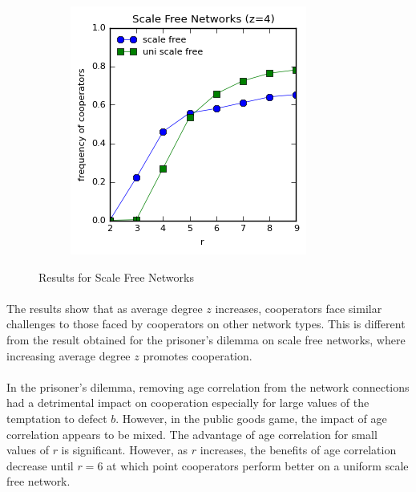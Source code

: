 \documentclass{article}
\begin{document}
\begin{figure}[h]
\begin{subfigure}[b]{0.4\textwidth}
			\caption{}
		\end{subfigure}
		\begin{subfigure}[b]{0.4\textwidth}
			\includegraphics[width=\textwidth]{fig/fixed/scalefreeall.png}
			\caption{}
		\end{subfigure}
		\caption{Results for Scale Free Networks}
		\label{fig:sfreenets}
	\end{figure}

	\paragraph{}The results show that as average degree $z$ increases, cooperators face similar challenges to those faced by cooperators on other network types.  This is different from the result obtained for the prisoner's dilemma on scale free networks, where increasing average degree $z$ promotes cooperation.

	\paragraph{}In the prisoner’s dilemma, removing age correlation from the network connections had a detrimental impact on cooperation especially for large values of the temptation to defect $b$.  However, in the public goods game, the impact of age correlation appears to be mixed.  The advantage of age correlation for small values of $r$ is significant.  However, as $r$ increases, the benefits of age correlation decrease until $r=6$ at which point cooperators perform better on a uniform scale free network.
\end{document}
